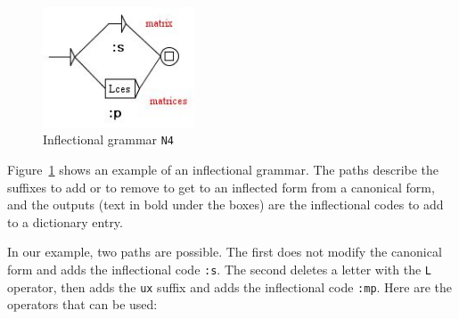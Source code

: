 \bigskip
\begin{figure}[h]
\begin{center}
\includegraphics[width=4.5cm]{resources/img/fig3-6.png}
\caption{Inflectional grammar
\texttt{N4}\label{fig-example-inflectional-grammar}}
\end{center}
\end{figure}

\bigskip
\noindent Figure~\ref{fig-example-inflectional-grammar} shows an example of an
inflectional grammar. The paths describe the suffixes to add or to remove to
get to an inflected form from a canonical form, and the outputs (text in bold under the boxes) are the
inflectional codes to add to a dictionary entry.

\bigskip
\noindent In our example, two paths are possible. The first does not modify the
canonical form and adds the inflectional code \verb+:s+. The second deletes a letter with
the \verb+L+ operator, then adds the \verb+ux+ suffix and adds the inflectional
code \verb+:mp+. Here are the operators that can be used:

